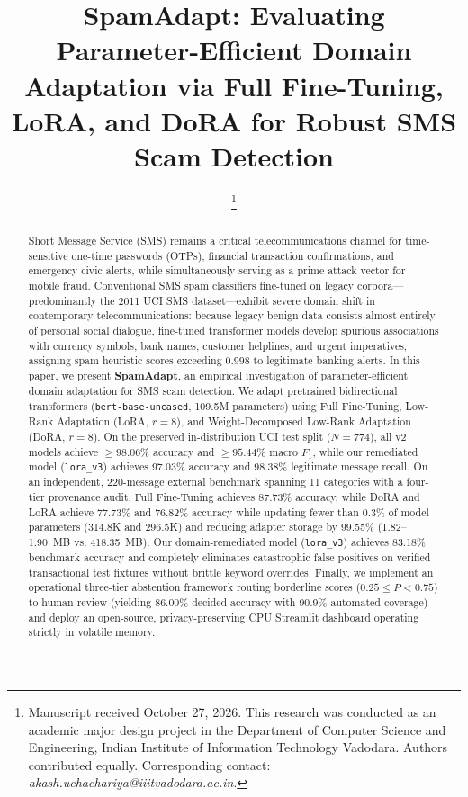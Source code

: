 \documentclass[conference]{IEEEtran}
\title{SpamAdapt: Evaluating Parameter-Efficient Domain Adaptation via Full Fine-Tuning, LoRA, and DoRA for Robust SMS Scam Detection}
\author{
    \IEEEauthorblockN{Akash Uchachariya\IEEEauthorrefmark{1}, Umang Mori\IEEEauthorrefmark{1}, and Keval Bamarotiya\IEEEauthorrefmark{1}}
    \IEEEauthorblockA{\IEEEauthorrefmark{1}\textit{Department of Computer Science and Engineering} \\
    \textit{Indian Institute of Information Technology Vadodara}, \textit{Gandhinagar, India} \\
    \textit{Emails: [akash.uchachariya, umang.mori, keval.bamarotiya]@iiitvadodara.ac.in}}
    \thanks{Manuscript received October 27, 2026. This research was conducted as an academic major design project in the Department of Computer Science and Engineering, Indian Institute of Information Technology Vadodara. Authors contributed equally. Corresponding contact: \textit{akash.uchachariya@iiitvadodara.ac.in}.}
}
\begin{document}
\maketitle

\begin{abstract}
Short Message Service (SMS) remains a critical telecommunications channel for time-sensitive one-time passwords (OTPs), financial transaction confirmations, and emergency civic alerts, while simultaneously serving as a prime attack vector for mobile fraud. Conventional SMS spam classifiers fine-tuned on legacy corpora---predominantly the 2011 UCI SMS dataset---exhibit severe domain shift in contemporary telecommunications: because legacy benign data consists almost entirely of personal social dialogue, fine-tuned transformer models develop spurious associations with currency symbols, bank names, customer helplines, and urgent imperatives, assigning spam heuristic scores exceeding 0.998 to legitimate banking alerts. In this paper, we present \textbf{SpamAdapt}, an empirical investigation of parameter-efficient domain adaptation for SMS scam detection. We adapt pretrained bidirectional transformers (\texttt{bert-base-uncased}, 109.5M parameters) using Full Fine-Tuning, Low-Rank Adaptation (LoRA, $r=8$), and Weight-Decomposed Low-Rank Adaptation (DoRA, $r=8$). On the preserved in-distribution UCI test split ($N=774$), all v2 models achieve $\ge 98.06\%$ accuracy and $\ge 95.44\%$ macro $F_1$, while our remediated model (\texttt{lora\_v3}) achieves 97.03\% accuracy and 98.38\% legitimate message recall. On an independent, 220-message external benchmark spanning 11 categories with a four-tier provenance audit, Full Fine-Tuning achieves 87.73\% accuracy, while DoRA and LoRA achieve 77.73\% and 76.82\% accuracy while updating fewer than 0.3\% of model parameters (314.8K and 296.5K) and reducing adapter storage by 99.55\% (1.82--1.90~MB vs. 418.35~MB). Our domain-remediated model (\texttt{lora\_v3}) achieves 83.18\% benchmark accuracy and completely eliminates catastrophic false positives on verified transactional test fixtures without brittle keyword overrides. Finally, we implement an operational three-tier abstention framework routing borderline scores ($0.25 \le P < 0.75$) to human review (yielding 86.00\% decided accuracy with 90.9\% automated coverage) and deploy an open-source, privacy-preserving CPU Streamlit dashboard operating strictly in volatile memory.
\end{abstract}
\end{document}
